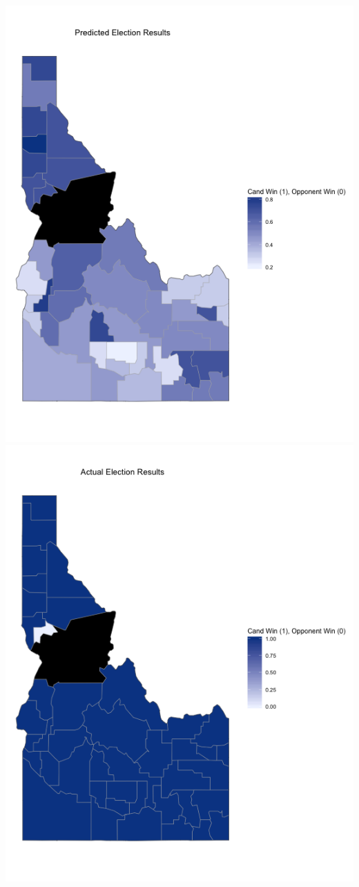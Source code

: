 \documentclass[11pt]{article}
\begin{document}
\includegraphics[scale=0.4]{../knn_plots/idaho_predicted.png} \includegraphics[scale=0.4]{../knn_plots/idaho_actual.png}\\
\end{document}
